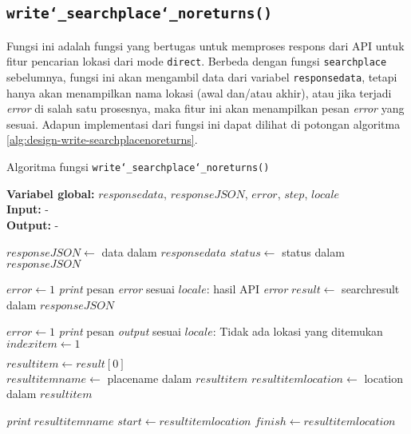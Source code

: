 \subsection{\texttt{write\char`_searchplace\char`_noreturns()}}
\label{sec:design-code-write-searchplacenoreturns}

Fungsi ini adalah fungsi yang bertugas untuk memproses respons dari API untuk fitur pencarian lokasi dari mode \verb|direct|. Berbeda dengan fungsi \verb|searchplace| sebelumnya, fungsi ini akan mengambil data dari variabel \verb|responsedata|, tetapi hanya akan menampilkan nama lokasi (awal dan/atau akhir), atau jika terjadi \textit{error} di salah satu prosesnya, maka fitur ini akan menampilkan pesan \textit{error} yang sesuai. Adapun implementasi dari fungsi ini dapat dilihat di potongan algoritma \ref{alg:design-write-searchplacenoreturns}.

\begin{algorithm}[h]
	\caption{Algoritma fungsi \texttt{write\char`_searchplace\char`_noreturns()}}
	\label{alg:design-write-searchplacenoreturns}
	\vspace{-0.6\baselineskip}
	\begin{flushleft}
		\textbf{Variabel global:} $responsedata$, $responseJSON$, $error$, $step$, $locale$ \\
		\textbf{Input:} - \\
		\textbf{Output:} - \\
	\end{flushleft}
	\vspace{-1.05\baselineskip}
	\begin{algorithmic}
		\State $responseJSON \gets$ data dalam $responsedata$
		\State $status \gets$ \textquotesingle\textquotesingle status\textquotesingle\textquotesingle\xspace dalam $responseJSON$
		
			\State $error \gets 1$
			\State \textit{print} pesan \textit{error} sesuai $locale$: hasil API \textit{error}
		\Else
			\State $result \gets$ \textquotesingle\textquotesingle searchresult\textquotesingle\textquotesingle\xspace dalam $responseJSON$
			
				\State $error \gets 1$
				\State \textit{print} pesan \textit{output} sesuai $locale$: Tidak ada lokasi yang ditemukan
			\Else
				\State $indexitem \gets 1$
				
				\State $resultitem \gets result[0]$ \\
				\State $resultitemname \gets$ \textquotesingle\textquotesingle placename\textquotesingle\textquotesingle\xspace dalam $resultitem$
				\State $resultitemlocation \gets$ \textquotesingle\textquotesingle location\textquotesingle\textquotesingle\xspace dalam $resultitem$
				
				\State \textit{print} $resultitemname$
					\State $start \gets resultitemlocation$
					\State $finish \gets resultitemlocation$
				\EndIf
			\EndIf
		\EndIf
	\end{algorithmic}
\end{algorithm}

